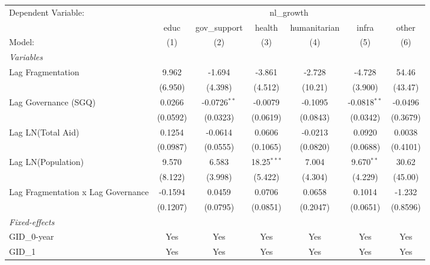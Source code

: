 \begingroup
\centering
\begin{tabular}{lcccccc}
   \tabularnewline \midrule \midrule
   Dependent Variable: & \multicolumn{6}{c}{nl\_growth}\\
                                      & educ     & gov\_support   & health        & humanitarian & infra          & other \\   
   Model:                             & (1)      & (2)            & (3)           & (4)          & (5)            & (6)\\  
   \midrule
   \emph{Variables}\\
   Lag Fragmentation                  & 9.962    & -1.694         & -3.861        & -2.728       & -4.728         & 54.46\\   
                                      & (6.950)  & (4.398)        & (4.512)       & (10.21)      & (3.900)        & (43.47)\\   
   Lag Governance (SGQ)               & 0.0266   & -0.0726$^{**}$ & -0.0079       & -0.1095      & -0.0818$^{**}$ & -0.0496\\   
                                      & (0.0592) & (0.0323)       & (0.0619)      & (0.0843)     & (0.0342)       & (0.3679)\\   
   Lag LN(Total Aid)                  & 0.1254   & -0.0614        & 0.0606        & -0.0213      & 0.0920         & 0.0038\\   
                                      & (0.0987) & (0.0555)       & (0.1065)      & (0.0820)     & (0.0688)       & (0.4101)\\   
   Lag LN(Population)                 & 9.570    & 6.583          & 18.25$^{***}$ & 7.004        & 9.670$^{**}$   & 30.62\\   
                                      & (8.122)  & (3.998)        & (5.422)       & (4.304)      & (4.229)        & (45.00)\\   
   Lag Fragmentation x Lag Governance & -0.1594  & 0.0459         & 0.0706        & 0.0658       & 0.1014         & -1.232\\   
                                      & (0.1207) & (0.0795)       & (0.0851)      & (0.2047)     & (0.0651)       & (0.8596)\\   
   \midrule
   \emph{Fixed-effects}\\
   GID\_0-year                        & Yes      & Yes            & Yes           & Yes          & Yes            & Yes\\  
   GID\_1                             & Yes      & Yes            & Yes           & Yes          & Yes            & Yes\\  

\end{tabular}
